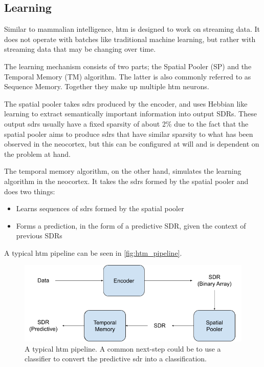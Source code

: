 \subsection{Learning}
Similar to mammalian intelligence, \gls*{htm} is designed to work on streaming data. It does not operate with batches like traditional machine learning, but rather with streaming data that may be changing over time. \par
The learning mechanism consists of two parts; the Spatial Pooler (SP) and the Temporal Memory (TM) algorithm. The latter is also commonly referred to as Sequence Memory. Together they make up multiple \gls*{htm} neurons.\par
The spatial pooler takes \glspl*{sdr} produced by the encoder, and uses Hebbian like learning to extract semantically important information into output SDRs. These output \glspl*{sdr} usually have a fixed sparsity of about 2\% due to the fact that the spatial pooler aims to produce \glspl*{sdr} that have similar sparsity to what has been observed in the neocortex, but this can be configured at will and is dependent on the problem at hand.\par
The temporal memory algorithm, on the other hand, simulates the learning algorithm in the neocortex. It takes the \glspl*{sdr} formed by the spatial pooler and does two things:
\begin{itemize}
    \item Learns sequences of \glspl*{sdr} formed by the spatial pooler
    \item Forms a prediction, in the form of a predictive SDR,  given the context of previous SDRs
\end{itemize}
A typical \gls*{htm} pipeline can be seen in \autoref{fig:htm_pipeline}.
\begin{figure}[H]
    \centering
    \includegraphics[width=\linewidth]{resources/related_works/htm_pipeline.png}
    \caption[The HTM Pipeline]{A typical \gls*{htm} pipeline. A common next-step could be to use a classifier to convert the predictive \gls*{sdr} into a classification. }
    \label{fig:htm_pipeline}
\end{figure}


